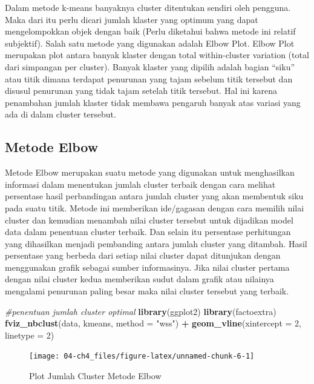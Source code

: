 \documentclass[
  oneside]{book}
\newenvironment{Shaded}{\begin{snugshade}}{\end{snugshade}}
\newcommand{\AttributeTok}[1]{\textcolor[rgb]{0.13,0.29,0.53}{#1}}
\newcommand{\CommentTok}[1]{\textcolor[rgb]{0.56,0.35,0.01}{\textit{#1}}}
\newcommand{\DecValTok}[1]{\textcolor[rgb]{0.00,0.00,0.81}{#1}}
\newcommand{\FunctionTok}[1]{\textcolor[rgb]{0.13,0.29,0.53}{\textbf{#1}}}
\newcommand{\NormalTok}[1]{#1}
\newcommand{\SpecialCharTok}[1]{\textcolor[rgb]{0.81,0.36,0.00}{\textbf{#1}}}
\newcommand{\StringTok}[1]{\textcolor[rgb]{0.31,0.60,0.02}{#1}}
\begin{document}
Dalam metode k-means banyaknya cluster ditentukan sendiri oleh pengguna. Maka dari itu perlu dicari jumlah klaster yang optimum yang dapat mengelompokkan objek dengan baik (Perlu diketahui bahwa metode ini relatif subjektif). Salah satu metode yang digunakan adalah Elbow Plot. Elbow Plot merupakan plot antara banyak klaster dengan total within-cluster variation (total dari simpangan per cluster). Banyak klaster yang dipilih adalah bagian ``siku'' atau titik dimana terdapat penurunan yang tajam sebelum titik tersebut dan disusul penurunan yang tidak tajam setelah titik tersebut. Hal ini karena penambahan jumlah klaster tidak membawa pengaruh banyak atas variasi yang ada di dalam cluster tersebut.

\subsection*{Metode Elbow}\label{metode-elbow}

Metode Elbow merupakan suatu metode yang digunakan untuk menghasilkan informasi dalam menentukan jumlah cluster terbaik dengan cara melihat persentase hasil perbandingan antara jumlah cluster yang akan membentuk siku pada suatu titik. Metode ini memberikan ide/gagasan dengan cara memilih nilai cluster dan kemudian menambah nilai cluster tersebut untuk dijadikan model data dalam penentuan cluster terbaik. Dan selain itu persentase perhitungan yang dihasilkan menjadi pembanding antara jumlah cluster yang ditambah. Hasil persentase yang berbeda dari setiap nilai cluster dapat ditunjukan dengan menggunakan grafik sebagai sumber informasinya. Jika nilai cluster pertama dengan nilai cluster kedua memberikan sudut dalam grafik atau nilainya mengalami penurunan paling besar maka nilai cluster tersebut yang terbaik.

\begin{Shaded}
\begin{Highlighting}[]
\CommentTok{\#penentuan jumlah cluster optimal}
\FunctionTok{library}\NormalTok{(ggplot2)}
\FunctionTok{library}\NormalTok{(factoextra)}
\FunctionTok{fviz\_nbclust}\NormalTok{(data, kmeans, }\AttributeTok{method =} \StringTok{"wss"}\NormalTok{) }\SpecialCharTok{+}
  \FunctionTok{geom\_vline}\NormalTok{(}\AttributeTok{xintercept =} \DecValTok{2}\NormalTok{, }\AttributeTok{linetype =} \DecValTok{2}\NormalTok{)}
\end{Highlighting}
\end{Shaded}

\begin{figure}[h]

{\centering \texttt{[image: 04-ch4\_files/figure-latex/unnamed-chunk-6-1]} 

}

\caption{Plot Jumlah Cluster Metode Elbow}\label{fig:unnamed-chunk-6}
\end{figure}
\end{document}
